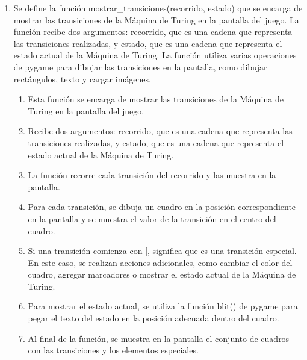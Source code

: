 \begin{enumerate}
    \item Se define la función mostrar\_transiciones(recorrido, estado) que se encarga de mostrar las transiciones de la Máquina de Turing en la pantalla del juego. La función recibe dos argumentos: recorrido, que es una cadena que representa las transiciones realizadas, y estado, que es una cadena que representa el estado actual de la Máquina de Turing. La función utiliza varias operaciones de pygame para dibujar las transiciones en la pantalla, como dibujar rectángulos, texto y cargar imágenes.\newline
     \begin{enumerate}
        \item Esta función se encarga de mostrar las transiciones de la Máquina de Turing en la pantalla del juego.
        \item Recibe dos argumentos: recorrido, que es una cadena que representa las transiciones realizadas, y estado, que es una cadena que representa el estado actual de la Máquina de Turing.\newline
        \item La función recorre cada transición del recorrido y las muestra en la pantalla.\newline
        \item Para cada transición, se dibuja un cuadro en la posición correspondiente en la pantalla y se muestra el valor de la transición en el centro del cuadro.\newline
        \item Si una transición comienza con [, significa que es una transición especial. En este caso, se realizan acciones adicionales, como cambiar el color del cuadro, agregar marcadores o mostrar el estado actual de la Máquina de Turing.\newline
        \item Para mostrar el estado actual, se utiliza la función blit() de pygame para pegar el texto del estado en la posición adecuada dentro del cuadro.\newline
        \item Al final de la función, se muestra en la pantalla el conjunto de cuadros con las transiciones y los elementos especiales.
     \end{enumerate}
    

\end{enumerate}
